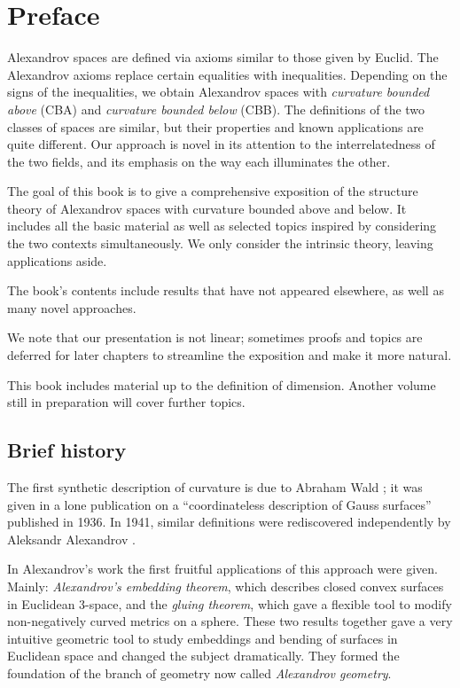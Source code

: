 \chapter*{Preface}

Alexandrov spaces are defined via axioms similar to those given by Euclid.
The Alexandrov axioms replace certain  equalities with inequalities. 
Depending on the signs of the inequalities, we obtain Alexandrov spaces with {}\emph{curvature bounded above} (CBA) and {}\emph{curvature bounded below} (CBB).
The definitions of the two classes of spaces are similar, but their properties and known applications are quite different.
Our approach is novel in its attention to the interrelatedness of the two fields, and its emphasis on the way each illuminates the other.

The goal of this book is to give a comprehensive exposition of the structure theory of Alexandrov spaces 
with curvature bounded above and below.
It includes all the basic material as well as selected topics inspired by considering the two contexts simultaneously.
We only consider  the intrinsic theory, leaving applications aside. 

The book's contents include results that have not appeared elsewhere, as well as many novel approaches.

We note that our presentation is not linear;
sometimes proofs and topics are deferred for later chapters to streamline the exposition and make it more natural.

This book includes material up to the definition of dimension.
Another volume still in preparation will cover further topics.


\section*{Brief history}

The first synthetic description of curvature is due to Abraham Wald \cite{wald}; 
it was given in a lone publication on a ``coordinateless description of Gauss surfaces'' published in 1936.
In 1941, similar definitions were rediscovered independently by Aleksandr Alexandrov \cite{alexandrov:def}.

In Alexandrov's work the first fruitful applications of this approach were given.
Mainly: {}\emph{Alexandrov's embedding theorem}, which describes closed convex surfaces in Euclidean 3-space,
and the {}\emph{gluing theorem}, which gave a flexible tool to modify non-negatively curved metrics on a sphere.
These two results together gave  a very intuitive geometric tool to study embeddings and bending of surfaces in Euclidean space and changed the subject dramatically.
They formed the foundation of the branch of geometry now called {}\emph{Alexandrov geometry}.


